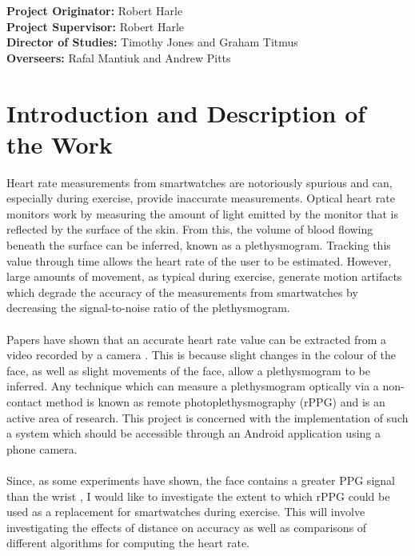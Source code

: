 \date{\vspace{-5ex}}
\maketitle
 \noindent
 \textbf{Project Originator:} Robert Harle \\
\textbf{Project Supervisor:} Robert Harle \\
\textbf{Director of Studies:} Timothy Jones and Graham Titmus \\
\textbf{Overseers:} Rafal Mantiuk and Andrew Pitts 

\section*{Introduction and Description of the Work}
Heart rate measurements from smartwatches are notoriously spurious and can, especially during exercise, provide inaccurate measurements. Optical heart rate monitors work by measuring the amount of light emitted by the monitor that is reflected by the surface of the skin. From this, the volume of blood flowing beneath the surface can be inferred, known as a plethysmogram. Tracking this value through time allows the heart rate of the user to be estimated. However, large amounts of movement, as typical during exercise, generate motion artifacts which degrade the accuracy of the measurements from smartwatches by decreasing the signal-to-noise ratio of the plethysmogram. \\ \\
Papers have shown that an accurate heart rate value can be extracted from a video recorded by a camera \cite{originalPaper}. This is because slight changes in the colour of the face, as well as slight movements of the face, allow a plethysmogram to be inferred. Any technique which can measure a plethysmogram optically via a non-contact method is known as remote photoplethysmography (rPPG) and is an active area of research. This project is concerned with the implementation of such a system which should be accessible through an Android application using a phone camera. \\ \\
Since, as some experiments have shown, the face contains a greater PPG signal than the wrist \cite{vanderKooij2019}, I would like to investigate the extent to which rPPG could be used as a replacement for smartwatches during exercise. This will involve investigating the effects of distance on accuracy as well as comparisons of different algorithms for computing the heart rate. \\ \\
